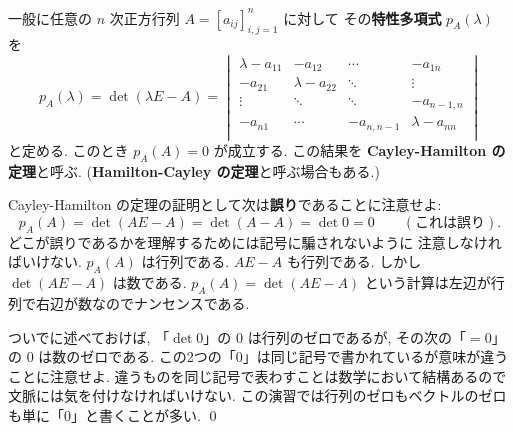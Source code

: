 \documentclass[12pt,twoside]{jarticle}
\begin{document}

\begin{guide}
  一般に任意の $n$ 次正方行列 $A=[a_{ij}]_{i,j=1}^n$ に対して
  その{\bf 特性多項式} $p_A(\lambda)$ を
  \begin{equation*}
    p_A(\lambda)=\det(\lambda E - A)=
    \begin{vmatrix}
      \lambda - a_{11} & -a_{12}          & \cdots & -a_{1n} \\
      -a_{21}          & \lambda - a_{22} & \ddots & \vdots \\
      \vdots           & \ddots           & \ddots & -a_{n-1,n} \\
      -a_{n1}          & \cdots           & -a_{n,n-1}& \lambda - a_{nn} \\
    \end{vmatrix}
  \end{equation*}
  と定める. このとき $p_A(A)=0$ が成立する.
  この結果を {\bf Cayley-Hamilton の定理}と呼ぶ.
  ({\bf Hamilton-Cayley の定理}と呼ぶ場合もある.)

  Cayley-Hamilton の定理の証明として次は{\bf 誤り}であることに注意せよ:
  \begin{equation*}
    p_A(A) = \det(AE - A) = \det(A - A) = \det 0 = 0
    \qquad(\text{これは誤り}).
  \end{equation*}
  どこが誤りであるかを理解するためには記号に騙されないように
  注意しなければいけない.  $p_A(A)$ は行列である.  $AE - A$ も行列である.  
  しかし $\det(AE-A)$ は数である.  
  $p_A(A)=\det(AE-A)$ という計算は左辺が行列で右辺が数なのでナンセンスである.

  ついでに述べておけば, 「$\det 0$」の $0$ は行列のゼロであるが, 
  その次の「$= 0$」の $0$ は数のゼロである.
  この2つの「$0$」は同じ記号で書かれているが意味が違うことに注意せよ.
  違うものを同じ記号で表わすことは数学において結構あるので
  文脈には気を付けなければいけない.
  この演習では行列のゼロもベクトルのゼロも単に「$0$」と書くことが多い.  
  \qed
\end{guide}

\end{document}
